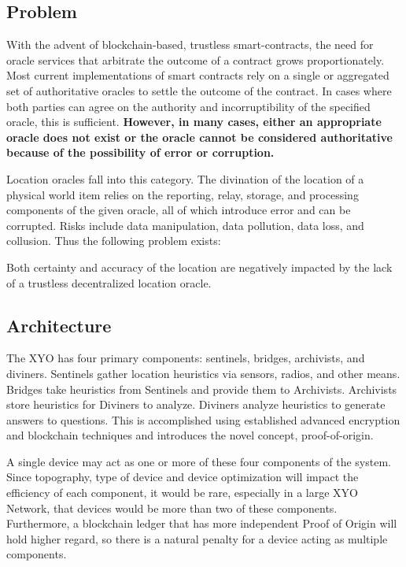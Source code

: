 \documentclass{article}
\begin{document}
\subsection {Problem}
With the advent of blockchain-based, trustless \glspl{smart-contract}, the need for \gls{oracle} services that arbitrate the outcome of a contract grows proportionately. Most current implementations of smart contracts rely on a single or aggregated set of authoritative oracles to settle the outcome of the contract. In cases where both parties can agree on the authority and incorruptibility of the specified oracle, this is sufficient. \textbf{However, in many cases, either an appropriate oracle does not exist or the oracle cannot be considered authoritative because of the possibility of error or corruption.}

Location oracles fall into this category. The divination of the location of a physical world item relies on the reporting, relay, storage, and processing components of the given oracle, all of which introduce error and can be corrupted. Risks include data manipulation, data pollution, data loss, and collusion. Thus the following problem exists:

Both \gls{certainty} and \gls{accuracy} of the location are negatively impacted by the lack of a trustless decentralized location oracle.

\subsection {Architecture}
The \Gls{XYO} has four primary components: \Glspl{sentinel}, \Glspl{bridge}, \Glspl{archivist}, and \Glspl{diviner}. Sentinels gather location \glspl{heuristic} via sensors, radios, and other means. Bridges take heuristics from Sentinels and provide them to Archivists. Archivists store heuristics for Diviners to analyze. Diviners analyze heuristics to generate answers to questions. This is accomplished using established advanced encryption and blockchain techniques and introduces the novel concept, \Gls{proof-of-origin}.

A single device may act as one or more of these four components of the system. Since topography, type of device and device optimization will impact the efficiency of each component, it would be rare, especially in a large XYO Network, that devices would be more than two of these components. Furthermore, a blockchain ledger that has more independent Proof of Origin will hold higher regard, so there is a natural penalty for a device acting as multiple components.
\end{document}
